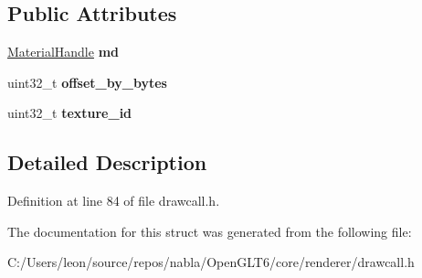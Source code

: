 \subsection*{Public Attributes}
\begin{DoxyCompactItemize}
\item 
\mbox{\label{structnabla_1_1renderer_1_1_material_draw_call_ade83bf315b1d92ffece880bf8464b8e9}} 
\mbox{\hyperlink{classnabla_1_1renderer_1_1_handle}{Material\+Handle}} {\bfseries md}
\item 
\mbox{\label{structnabla_1_1renderer_1_1_material_draw_call_ad28749431a86402dbea418b16c32dac7}} 
uint32\+\_\+t {\bfseries offset\+\_\+by\+\_\+bytes}
\item 
\mbox{\label{structnabla_1_1renderer_1_1_material_draw_call_aa05e468bd8f009e3adc941b56743635c}} 
uint32\+\_\+t {\bfseries texture\+\_\+id}
\end{DoxyCompactItemize}


\subsection{Detailed Description}


Definition at line 84 of file drawcall.\+h.



The documentation for this struct was generated from the following file\+:\begin{DoxyCompactItemize}
\item 
C\+:/\+Users/leon/source/repos/nabla/\+Open\+G\+L\+T6/core/renderer/drawcall.\+h\end{DoxyCompactItemize}
